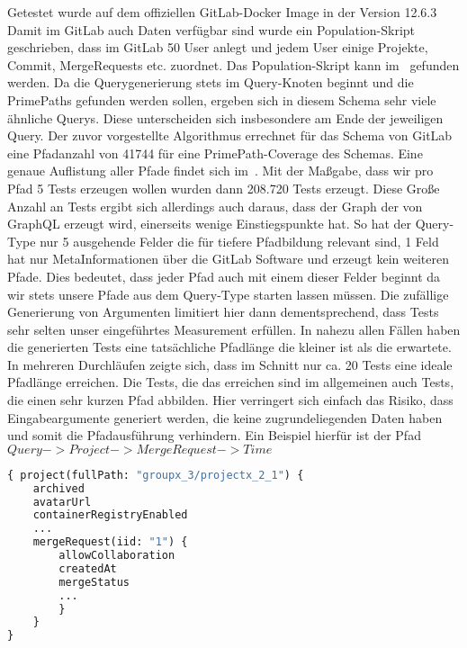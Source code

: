 Getestet wurde auf dem offiziellen GitLab-Docker Image in der Version 12.6.3
Damit im GitLab auch Daten verfügbar sind wurde ein Population-Skript geschrieben, dass im GitLab
50 User anlegt und jedem User einige Projekte, Commit, MergeRequests etc. zuordnet.
Das Population-Skript kann im~\cite[Github]{populationscript} gefunden werden.
Da die Querygenerierung stets im Query-Knoten beginnt und die PrimePaths gefunden werden sollen, ergeben sich in diesem
Schema sehr viele ähnliche Querys.
Diese unterscheiden sich insbesondere am Ende der jeweiligen Query.
Der zuvor vorgestellte Algorithmus errechnet für das Schema von GitLab eine Pfadanzahl von 41744 für eine
PrimePath-Coverage des Schemas.
Eine genaue Auflistung aller Pfade findet sich im~\cite[GitHub]{gitlabpaths}.
Mit der Maßgabe, dass wir pro Pfad 5 Tests erzeugen wollen wurden dann 208.720 Tests erzeugt.
Diese Große Anzahl an Tests ergibt sich allerdings auch daraus, dass der Graph der von
GraphQL erzeugt wird, einerseits wenige Einstiegspunkte hat.
So hat der Query-Type nur 5 ausgehende Felder die für tiefere Pfadbildung relevant sind, 1 Feld hat nur MetaInformationen über
die GitLab Software und erzeugt kein weiteren Pfade.
Dies bedeutet, dass jeder Pfad auch mit einem dieser Felder beginnt da wir stets
unsere Pfade aus dem Query-Type starten lassen müssen.
Die zufällige Generierung von Argumenten limitiert hier dann dementsprechend, dass Tests sehr selten unser
eingeführtes Measurement erfüllen.
In nahezu allen Fällen haben die generierten Tests eine tatsächliche Pfadlänge die kleiner ist als die erwartete.
In mehreren Durchläufen zeigte sich, dass im Schnitt nur ca. 20 Tests eine ideale Pfadlänge erreichen.
Die Tests, die das erreichen sind im allgemeinen auch Tests, die einen sehr kurzen Pfad abbilden.
Hier verringert sich einfach das Risiko, dass Eingabeargumente generiert werden, die keine zugrundeliegenden Daten haben und somit die
Pfadausführung verhindern.
Ein Beispiel hierfür ist der Pfad $Query -> Project -> MergeRequest -> Time$

\begin{lstlisting}[language=GraphQL]
{ project(fullPath: "groupx_3/projectx_2_1") {
    archived
    avatarUrl
    containerRegistryEnabled
    ...
    mergeRequest(iid: "1") {
        allowCollaboration
        createdAt
        mergeStatus
        ...
        }
    }
}
\end{lstlisting}

